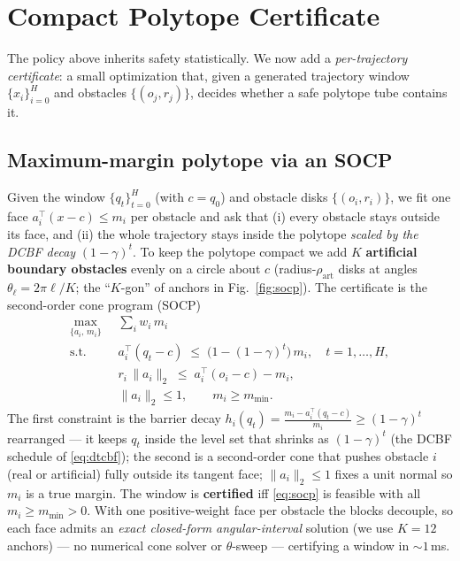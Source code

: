 \documentclass[letterpaper, 10 pt, conference]{ieeeconf}
\newcommand{\keyword}[1]{\textbf{#1}}
\begin{document}
\section{Compact Polytope Certificate}\label{sec:cert}
The policy above inherits safety statistically. We now add a \emph{per-trajectory certificate}: a small optimization that, given a generated trajectory window $\{x_i\}_{i=0}^{H}$ and obstacles $\{(o_j,r_j)\}$, decides whether a safe polytope tube contains it.

\subsection{Maximum-margin polytope via an SOCP}
Given the window $\{q_t\}_{t=0}^{H}$ (with $c=q_0$) and obstacle disks $\{(o_i,r_i)\}$, we fit one face $a_i^\top(x-c)\le m_i$ per obstacle and ask that (i) every obstacle stays outside its face, and (ii) the whole trajectory stays inside the polytope \emph{scaled by the DCBF decay} $(1-\gamma)^t$. To keep the polytope compact we add $K$ \keyword{artificial boundary obstacles} evenly on a circle about $c$ (radius-$\rho_{\text{art}}$ disks at angles $\theta_\ell=2\pi\ell/K$; the ``$K$-gon'' of anchors in Fig.~\ref{fig:socp}). The certificate is the second-order cone program (SOCP)
\begin{equation}
\begin{aligned}
\max_{\{a_i,\,m_i\}}\;\; & \sum_i w_i\, m_i \\
\text{s.t.}\;\; & a_i^\top(q_t-c)\;\le\;\big(1-(1-\gamma)^{t}\big)\, m_i, \quad t=1,\dots,H,\\
& r_i\,\|a_i\|_2 \;\le\; a_i^\top(o_i-c)-m_i,\\
& \|a_i\|_2\le 1,\qquad m_i\ge m_{\min}.
\end{aligned}
\label{eq:socp}
\end{equation}
The first constraint is the barrier decay $h_i(q_t)=\tfrac{m_i-a_i^\top(q_t-c)}{m_i}\ge(1-\gamma)^t$ rearranged --- it keeps $q_t$ inside the level set that shrinks as $(1-\gamma)^t$ (the DCBF schedule of \eqref{eq:dtcbf}); the second is a second-order cone that pushes obstacle $i$ (real or artificial) fully outside its tangent face; $\|a_i\|_2\le1$ fixes a unit normal so $m_i$ is a true margin. The window is \keyword{certified} iff \eqref{eq:socp} is feasible with all $m_i\ge m_{\min}>0$. With one positive-weight face per obstacle the blocks decouple, so each face admits an \emph{exact closed-form angular-interval} solution (we use $K{=}12$ anchors) --- no numerical cone solver or $\theta$-sweep --- certifying a window in ${\sim}1$\,ms.
\end{document}
